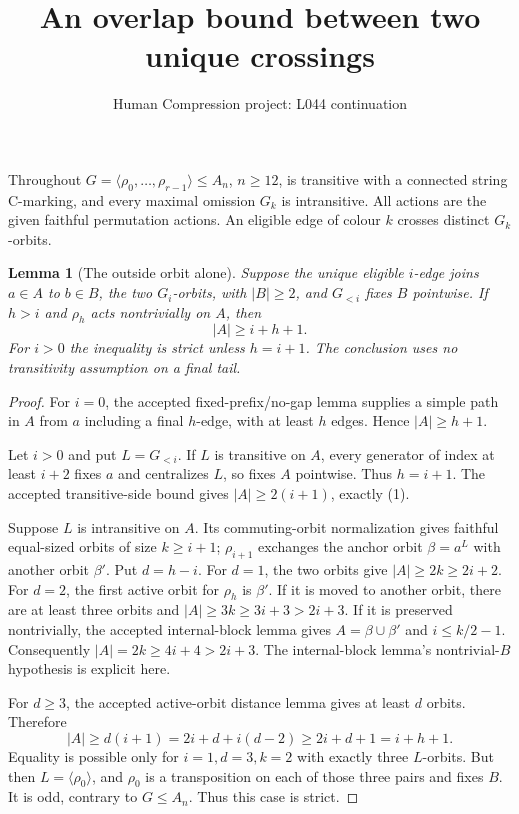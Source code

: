 \documentclass[11pt,a4paper]{article}
\title{An overlap bound between two unique crossings}
\author{Human Compression project: L044 continuation}
\date{}
\newtheorem{lemma}{Lemma}
\newcommand{\gen}[1]{\langle#1\rangle}
\begin{document}
\maketitle
Throughout $G=\gen{\rho_0,\ldots,\rho_{r-1}}\leq A_n$,
$n\geq12$, is transitive with a connected string C-marking,
and every maximal omission $G_k$ is intransitive. All actions
are the given faithful permutation actions. An eligible edge of
colour $k$ crosses distinct $G_k$-orbits.

\begin{lemma}[The outside orbit alone]\label{outside}
Suppose the unique eligible $i$-edge joins $a\in A$ to $b\in B$,
the two $G_i$-orbits, with $|B|\geq2$, and $G_{<i}$ fixes $B$ pointwise.
If $h>i$ and $\rho_h$ acts nontrivially on $A$, then
\[
                         |A|\geq i+h+1.                 \tag{1}
\]
For $i>0$ the inequality is strict unless $h=i+1$.
The conclusion uses no transitivity assumption on a final tail.
\end{lemma}
\begin{proof}
For $i=0$, the accepted fixed-prefix/no-gap lemma supplies a
simple path in $A$ from $a$ including a final $h$-edge, with
at least $h$ edges. Hence $|A|\geq h+1$.

Let $i>0$ and put $L=G_{<i}$. If $L$ is transitive on $A$,
every generator of index at least $i+2$ fixes $a$ and centralizes
$L$, so fixes $A$ pointwise. Thus $h=i+1$. The accepted
transitive-side bound gives $|A|\geq2(i+1)$, exactly (1).

Suppose $L$ is intransitive on $A$. Its commuting-orbit
normalization gives faithful equal-sized orbits of size
$k\geq i+1$; $\rho_{i+1}$ exchanges the anchor orbit
$\beta=a^L$ with another orbit $\beta'$. Put $d=h-i$.
For $d=1$, the two orbits give $|A|\geq2k\geq2i+2$.
For $d=2$, the first active orbit for $\rho_h$ is $\beta'$.
If it is moved to another orbit, there are at least three
orbits and $|A|\geq3k\geq3i+3>2i+3$.
If it is preserved nontrivially, the accepted internal-block
lemma gives $A=\beta\cup\beta'$ and $i\leq k/2-1$.
Consequently $|A|=2k\geq4i+4>2i+3$.
The internal-block lemma's nontrivial-$B$ hypothesis is explicit here.

For $d\geq3$, the accepted active-orbit distance lemma gives
at least $d$ orbits. Therefore
\[
 |A|\geq d(i+1)=2i+d+i(d-2)\geq2i+d+1=i+h+1.
\]
Equality is possible only for $i=1,d=3,k=2$ with exactly three
$L$-orbits. But then $L=\gen{\rho_0}$, and $\rho_0$ is a
transposition on each of those three pairs and fixes $B$.
It is odd, contrary to $G\leq A_n$. Thus this case is strict.
\end{proof}
\end{document}
